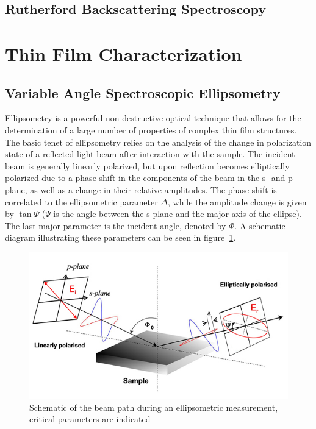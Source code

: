 
\subsection{Rutherford Backscattering Spectroscopy}





\section{Thin Film Characterization}


	
\subsection{Variable Angle Spectroscopic Ellipsometry}

Ellipsometry is a powerful non-destructive optical technique that allows for the determination of a large number of properties of complex thin film structures. The basic tenet of ellipsometry relies on the analysis of the change in polarization state of a reflected light beam after interaction with the sample. The incident beam is generally linearly polarized, but upon reflection becomes elliptically polarized due to a phase shift in the components of the beam in the s- and p-plane, as well as a change in their relative amplitudes. The phase shift is correlated to the ellipsometric parameter $\Delta$, while the amplitude change is given by $\tan\Psi$ ($\Psi$ is the angle between the s-plane and the major axis of the ellipse). The last major parameter is the incident angle, denoted by $\Phi$. A schematic diagram illustrating these parameters can be seen in figure~\ref{fig:ellipsometry}. 

\begin{figure}[htbp]
   \centering
   \includegraphics[width=\linewidth]{./figures/characterization/ellipsometryDiagram_simple} 
   \caption[Ellipsometric Beam Path and Modeling Parameters]{Schematic of the beam path during an %
   					ellipsometric measurement, \\ critical parameters are indicated}
   \label{fig:ellipsometry}
\end{figure}


